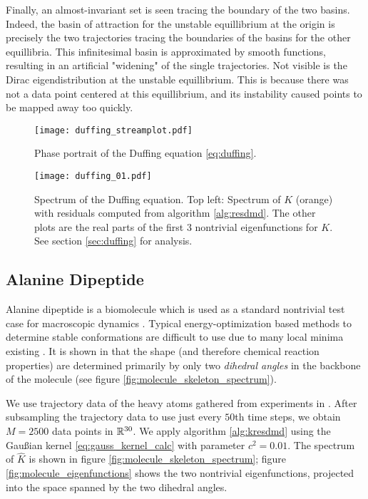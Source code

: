 Finally, an almost-invariant set is seen tracing 
the boundary of the two basins. Indeed, the basin of attraction for the unstable 
equillibrium  at the origin is precisely the two trajectories tracing the boundaries of the 
basins for the other equillibria. This infinitesimal basin is approximated by smooth 
functions, resulting in an artificial "widening" of the single trajectories. Not visible 
is the Dirac eigendistribution at the unstable equillibrium. This is because there was not 
a data point centered at this equillibrium, and its instability caused points to be mapped 
away too quickly. 


\begin{figure}
    \centering
    \texttt{[image: duffing\_streamplot.pdf]}
    \caption{
        Phase portrait of the Duffing equation \ref{eq:duffing}. 
    }\label{fig:duffing_streamplot}
\end{figure}

\begin{figure}
    \centering
    \texttt{[image: duffing\_01.pdf]}
    \caption{
        Spectrum of the Duffing equation. Top left: Spectrum of $K$ (orange) with 
        residuals computed from algorithm \ref{alg:resdmd}. The other plots are the 
        real parts of the first $3$ nontrivial eigenfunctions for $K$. See section 
        \ref{sec:duffing} for analysis. 
    }\label{fig:duffing}
\end{figure}

\subsection{Alanine Dipeptide}\label{sec:molecule}

Alanine dipeptide is a biomolecule which is used as a standard nontrivial test case 
for macroscopic dynamics \cite{entropic}. Typical energy-optimization based methods 
to determine stable conformations are difficult to use due to many local minima 
existing \cite{molecule}. It is shown in \cite{molecule} that the shape (and therefore 
chemical reaction properties) are determined primarily by only two \emph{dihedral angles} 
in the backbone of the molecule (see figure \ref{fig:molecule_skeleton_spectrum}). 

We use trajectory data of the heavy atoms gathered from experiments in 
\cite{molecule_experiment}. After subsampling the trajectory data to use just every $50$th 
time steps, we obtain $M = 2500$ data points in $\mathbb{R}^{30}$. We apply algorithm 
\ref{alg:kresdmd} using the Gaußian kernel \ref{eq:gauss_kernel_calc} with parameter 
$c^2 = 0.01$. The spectrum of $\widehat{ K }$ is shown in figure 
\ref{fig:molecule_skeleton_spectrum}; figure \ref{fig:molecule_eigenfunctions} shows the 
two nontrivial eigenfunctions, projected into the space spanned by the two dihedral angles. 

